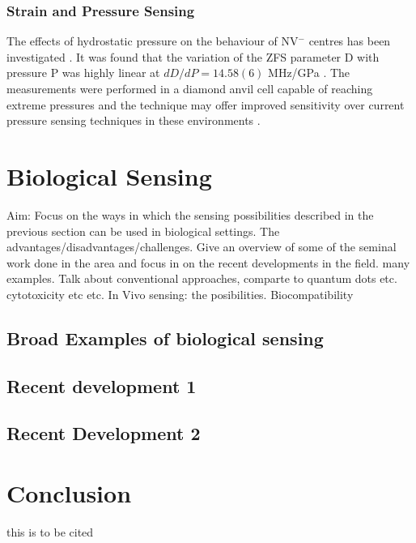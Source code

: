 \documentclass[10pt]{article}
\begin{document}
\begin{multicols}{2}
\subsubsection{Strain and Pressure Sensing}
The effects of hydrostatic pressure on the behaviour of NV$^-$ centres has been investigated \cite{doherty2014electronic}. It was found that the variation of the ZFS parameter D with pressure P was highly linear at $dD/dP = 14.58(6)$ MHz/GPa \cite{doherty2014electronic}. The measurements were performed in a diamond anvil cell capable of reaching extreme pressures and the technique may offer improved sensitivity over current pressure sensing techniques in these environments \cite{doherty2014electronic}. 

\section{Biological Sensing}
Aim: Focus on the ways in which the sensing possibilities described in the previous section can be used in biological settings. The advantages/disadvantages/challenges. Give an overview of some of the seminal work done in the area and focus in on the recent developments in the field. many examples. Talk about conventional approaches, comparte to quantum dots etc. cytotoxicity etc etc. In Vivo sensing: the posibilities. Biocompatibility

\subsection{Broad Examples of biological sensing}
\subsection{Recent development 1}
\subsection{Recent Development 2}

\section{Conclusion}
this  is to be cited \cite{maletinsky2012robust}

\newpage
\printbibliography

\end{multicols}
\end{document}
